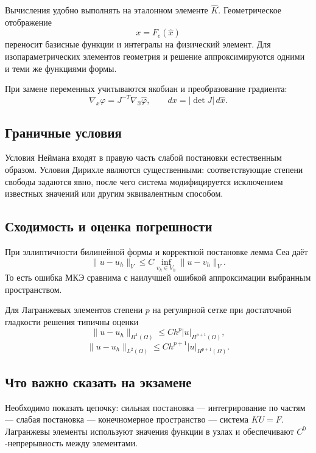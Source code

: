Вычисления удобно выполнять на эталонном элементе $\widehat K$. Геометрическое
отображение
\[
    x=F_e(\widehat x)
\]
переносит базисные функции и интегралы на физический элемент. Для
изопараметрических элементов геометрия и решение аппроксимируются одними и теми
же функциями формы.

При замене переменных учитываются якобиан и преобразование градиента:
\[
    \nabla_x\varphi=J^{-T}\nabla_{\widehat x}\widehat\varphi,
    \qquad
    dx=|\det J|\,d\widehat x.
\]

\subsection{Граничные условия}

Условия Неймана входят в правую часть слабой постановки естественным образом.
Условия Дирихле являются существенными: соответствующие степени свободы задаются
явно, после чего система модифицируется исключением известных значений или
другим эквивалентным способом.

\subsection{Сходимость и оценка погрешности}

При эллиптичности билинейной формы и корректной постановке лемма Сеа даёт
\[
    \|u-u_h\|_V
    \leq C\inf_{v_h\in V_h}\|u-v_h\|_V.
\]
То есть ошибка МКЭ сравнима с наилучшей ошибкой аппроксимации выбранным
пространством.

Для Лагранжевых элементов степени $p$ на регулярной сетке при достаточной
гладкости решения типичны оценки
\[
    \|u-u_h\|_{H^1(\Omega)}\leq C h^p|u|_{H^{p+1}(\Omega)},
\]
\[
    \|u-u_h\|_{L^2(\Omega)}\leq C h^{p+1}|u|_{H^{p+1}(\Omega)}.
\]

\subsection{Что важно сказать на экзамене}

Необходимо показать цепочку: сильная постановка --- интегрирование по частям ---
слабая постановка --- конечномерное пространство --- система $KU=F$.
Лагранжевы элементы используют значения функции в узлах и обеспечивают
$C^0$-непрерывность между элементами.

\newpage